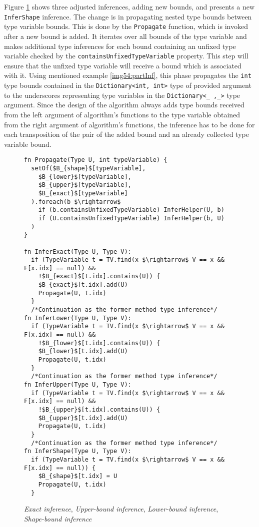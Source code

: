 Figure \ref{img55:mainTypeInference2} shows three adjusted inferences, adding new bounds, and presents a new \texttt{InferShape} inference.
The change is in propagating nested type bounds between type variable bounds. 
This is done by the \texttt{Propagate} function, which is invoked after a new bound is added. 
It iterates over all bounds of the type variable and makes additional type inferences for each bound containing an unfixed type variable checked by the \texttt{containsUnfixedTypeVariable} property. 
This step will ensure that the unfixed type variable will receive a bound which is associated with it. 
Using mentioned example \ref{img54:partInf}, this phase propagates the  \texttt{int} type bounds contained in the \texttt{Dictionary<int, int>} type of provided argument to the underscores representing type variables in the \texttt{Dictionary<\_ ,\_>} type argument.
Since the design of the algorithm always adds type bounds received from the left argument of algorithm's functions to the type variable obtained from the right argument of algorithm's functions, the inference has to be done for each transposition of the pair of the added bound and an already collected type variable bound.
\begin{figure}[h!]
\begin{lstlisting}[style=myAlgo, mathescape=true]
fn Propagate(Type U, int typeVariable) {
  setOf($B_{shape}$[typeVariable],
    $B_{lower}$[typeVariable],
    $B_{upper}$[typeVariable],
    $B_{exact}$[typeVariable]
  ).foreach(b $\rightarrow$
    if (b.containsUnfixedTypeVariable) InferHelper(U, b)
    if (U.containsUnfixedTypeVariable) InferHelper(b, U)
  )
}

fn InferExact(Type U, Type V):
  if (TypeVariable t = TV.find(x $\rightarrow$ V == x && F[x.idx] == null) &&
    !$B_{exact}$[t.idx].contains(U)) {
    $B_{exact}$[t.idx].add(U)
    Propagate(U, t.idx)
  }
  /*Continuation as the former method type inference*/
fn InferLower(Type U, Type V):
  if (TypeVariable t = TV.find(x $\rightarrow$ V == x && F[x.idx] == null) &&
    !$B_{lower}$[t.idx].contains(U)) {
    $B_{lower}$[t.idx].add(U)
    Propagate(U, t.idx)
  }
  /*Continuation as the former method type inference*/
fn InferUpper(Type U, Type V):
  if (TypeVariable t = TV.find(x $\rightarrow$ V == x && F[x.idx] == null) &&
    !$B_{upper}$[t.idx].contains(U)) {
    $B_{upper}$[t.idx].add(U)
    Propagate(U, t.idx)
  }
  /*Continuation as the former method type inference*/
fn InferShape(Type U, Type V):
  if (TypeVariable t = TV.find(x $\rightarrow$ V == x && F[x.idx] == null)) {
    $B_{shape}$[t.idx] = U
    Propagate(U, t.idx)
  }
\end{lstlisting}
\caption{\textit{Exact inference}, \textit{Upper-bound inference}, \textit{Lower-bound inference}, \textit{Shape-bound inference}}
\label{img55:mainTypeInference2}
\end{figure}
